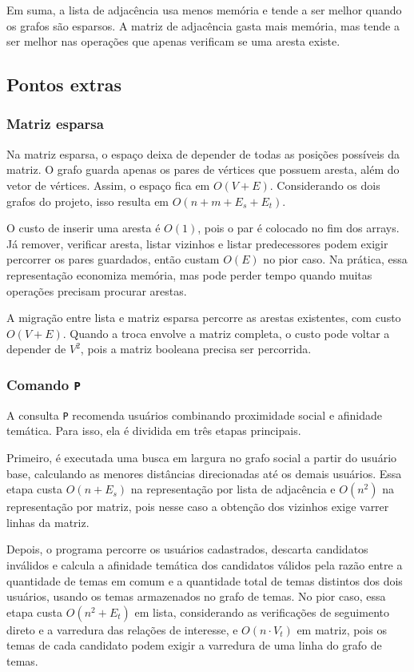 \documentclass[12pt,a4paper]{article}
\begin{document}
Em suma, a lista de adjacência usa menos memória e tende a ser melhor quando
os grafos são esparsos. A matriz de adjacência gasta mais memória, mas tende a ser melhor
nas operações que apenas verificam se uma aresta existe.

\subsection{Pontos extras}

\subsubsection{Matriz esparsa}

Na matriz esparsa, o espaço deixa de depender de todas as posições possíveis da matriz.
O grafo guarda apenas os pares de vértices que possuem aresta, além do vetor de vértices.
Assim, o espaço fica em $O(V + E)$. Considerando os dois grafos do projeto, isso resulta
em $O(n + m + E_s + E_t)$.

O custo de inserir uma aresta é $O(1)$, pois o par é colocado no fim dos
arrays. Já remover, verificar aresta, listar vizinhos e listar predecessores podem exigir
percorrer os pares guardados, então custam $O(E)$ no pior caso. Na prática, essa
representação economiza memória, mas pode perder tempo quando muitas operações
precisam procurar arestas.

A migração entre lista e matriz esparsa percorre as arestas existentes, com custo
$O(V + E)$. Quando a troca envolve a matriz completa, o custo pode voltar a depender de
$V^2$, pois a matriz booleana precisa ser percorrida.

\subsubsection{Comando \texttt{P}}

A consulta \texttt{P} recomenda usuários combinando proximidade social e afinidade
temática. Para isso, ela é dividida em três etapas principais.

Primeiro, é executada uma
busca em largura no grafo social a partir do usuário base, calculando as menores
distâncias direcionadas até os demais usuários. Essa etapa custa $O(n + E_s)$ na
representação por lista de adjacência e $O(n^2)$ na representação por matriz, pois nesse
caso a obtenção dos vizinhos exige varrer linhas da matriz.

Depois, o programa percorre os usuários cadastrados, descarta candidatos inválidos e
calcula a afinidade temática dos candidatos válidos pela razão entre a quantidade de temas
em comum e a quantidade total de temas distintos dos dois usuários, usando os temas
armazenados no grafo de temas. No pior caso, essa etapa custa $O(n^2 + E_t)$ em lista,
considerando as verificações de seguimento direto e a varredura das relações de interesse,
e $O(n \cdot V_t)$ em matriz, pois os temas de cada candidato podem exigir a varredura
de uma linha do grafo de temas.
\end{document}
